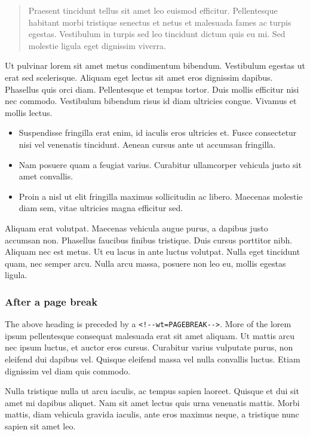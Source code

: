 \documentclass[11pt]{article}
\begin{document}
\begin{quote}
Praesent tincidunt tellus sit amet leo euismod efficitur. Pellentesque
habitant morbi tristique senectus et netus et malesuada fames ac turpis
egestas. Vestibulum in turpis sed leo tincidunt dictum quis eu mi. Sed
molestie ligula eget dignissim viverra.
\end{quote}

Ut pulvinar lorem sit amet metus condimentum bibendum. Vestibulum
egestas ut erat sed scelerisque. Aliquam eget lectus sit amet eros
dignissim dapibus. Phasellus quis orci diam. Pellentesque et tempus
tortor. Duis mollis efficitur nisi nec commodo. Vestibulum bibendum
risus id diam ultricies congue. Vivamus et mollis lectus.

\begin{itemize}
\item
  Suspendisse fringilla erat enim, id iaculis eros ultricies et. Fusce
  consectetur nisi vel venenatis tincidunt. Aenean cursus ante ut
  accumsan fringilla.
\item
  Nam posuere quam a feugiat varius. Curabitur ullamcorper vehicula
  justo sit amet convallis.
\item
  Proin a nisl ut elit fringilla maximus sollicitudin ac libero.
  Maecenas molestie diam sem, vitae ultricies magna efficitur sed.
\end{itemize}

Aliquam erat volutpat. Maecenas vehicula augue purus, a dapibus justo
accumsan non. Phasellus faucibus finibus tristique. Duis cursus
porttitor nibh. Aliquam nec est metus. Ut eu lacus in ante luctus
volutpat. Nulla eget tincidunt quam, nec semper arcu. Nulla arcu massa,
posuere non leo eu, mollis egestas ligula.

\hypertarget{after-a-page-break}{%
\subsubsection{After a page break}\label{after-a-page-break}}

The above heading is preceded by a
\texttt{\textless{}!-\/-wt=PAGEBREAK-\/-\textgreater{}}. More of the
lorem ipsum pellentesque consequat malesuada erat sit amet aliquam. Ut
mattis arcu nec ipsum luctus, et auctor eros cursus. Curabitur varius
vulputate purus, non eleifend dui dapibus vel. Quisque eleifend massa
vel nulla convallis luctus. Etiam dignissim vel diam quis commodo.

Nulla tristique nulla ut arcu iaculis, ac tempus sapien laoreet. Quisque
et dui sit amet mi dapibus aliquet. Nam sit amet lectus quis urna
venenatis mattis. Morbi mattis, diam vehicula gravida iaculis, ante eros
maximus neque, a tristique nunc sapien sit amet leo.
\end{document}

